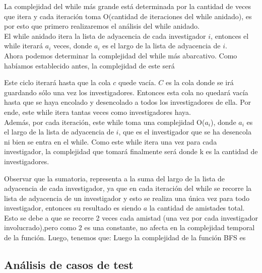 \indent La complejidad del while más grande está determinada por la cantidad de
veces que itera 
y cada iteración toma O(cantidad de iteraciones del while anidado), es por esto
que
primero realizaremos el análisis del while anidado.\\

\indent El while anidado itera la lista de adyacencia de cada investigador $i$,
entonces
el while iterará $a_i$ veces, donde $a_i$ es el largo
de la lista de adyacencia de $i$.\\

\indent Ahora podemos determinar la complejidad del while más abarcativo. Como
habíamos
establecido antes, la complejidad de este será 

\indent Este ciclo iterará hasta que la cola $c$ quede vacía. $C$ es la cola
donde se irá guardando
sólo una vez los investigadores. Entonces esta cola no quedará vacía hasta que
se haya encolado y desencolado 
a todos los investigadores de ella. Por ende, este while itera tantas veces como
investigadores haya.\\

\indent Además, por cada iteración, este while toma una complejidad O($a_i$),
donde $a_i$ es el largo
de la lista de adyacencia de $i$, que es el
investigador que se ha desencola ni bien se entra en el while. Como este while
itera una vez para cada investigador,
la complejidad que tomará finalmente será 
 donde k es la cantidad de investigadores.

\indent Observar que la sumatoria, representa a la suma del largo de la lista de
adyacencia de cada investigador, ya que en cada iteración del while se recorre
la lista de adyacencia de un investigador y esto se realiza una única vez para
todo investigador, entonces su resultado es 
siendo $a$ la cantidad de amistades total. Esto se debe a que se recorre 2 veces cada
amistad (una vez por cada investigador involucrado),pero como 2 es una
constante, no afecta
en la complejidad temporal de la función. Luego, tenemos que:
Luego la complejidad de la función BFS es 

\subsection{Análisis de casos de test}
